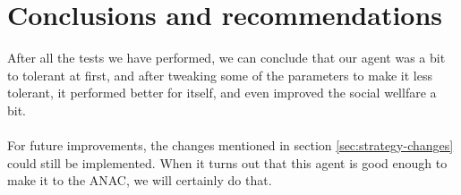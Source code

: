 \section{Conclusions and recommendations}
After all the tests we have performed, we can conclude that our agent was a bit to tolerant at first, and after tweaking some of the parameters to make it less tolerant, it performed better for itself, and even improved the social wellfare a bit.
\\\\
For future improvements, the changes mentioned in section \ref{sec:strategy-changes} could still be implemented. When it turns out that this agent is good enough to make it to the ANAC, we will certainly do that.